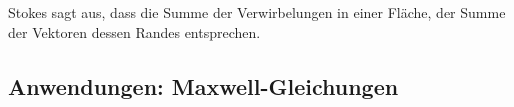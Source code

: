 Stokes sagt aus, dass die Summe der Verwirbelungen in einer Fläche, der Summe der Vektoren dessen Randes entsprechen.

\subsection{Anwendungen: Maxwell-Gleichungen}

